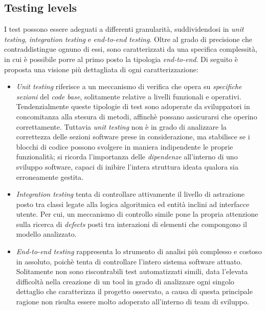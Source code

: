 \documentclass{article}
\begin{document}
\subsection*{Testing levels}
\large
I test possono essere adeguati a differenti granularità, suddividendosi in \textit{unit testing}, \textit{integration testing} e \textit{end-to-end testing}. Oltre al grado di precisione che contraddistingue ognuno di essi, sono caratterizzati da una specifica complessità, in cui è possibile porre al primo posto la tipologia \textit{end-to-end}. Di seguito è proposta una visione più dettagliata di ogni caratterizzazione:
\begin{itemize}[label={-}]
    \itemsep0em
    \item \textit{Unit testing} riferisce a un meccanismo di verifica che opera su \textit{specifiche sezioni} del \textit{code base}, solitamente relative a livelli funzionali e operativi. Tendenzialmente queste tipologie di test sono adoperate da sviluppatori in concomitanza alla stesura di metodi, affinchè possano assicurarsi che operino correttamente. Tuttavia \textit{unit testing} non è in grado di analizzare la correttezza delle sezioni software prese in considerazione, ma stabilisce se i blocchi di codice possono svolgere in maniera indipendente le proprie funzionalità; si ricorda l'importanza delle \textit{dipendenze} all'interno di uno sviluppo software, capaci di inibire l'intera struttura ideata qualora sia erroneamente gestita.
    \item \textit{Integration testing} tenta di controllare attivamente il livello di astrazione posto tra classi legate alla logica algoritmica ed entità inclini ad interfacce utente. Per cui, un meccanismo di controllo simile pone la propria attenzione sulla ricerca di \textit{defects} posti tra interazioni di elementi che compongono il modello analizzato.     
    \item \textit{End-to-end testing} rappresenta lo strumento di analisi più complesso e costoso in assoluto, poichè tenta di controllare l'intero sistema software attuato. Solitamente non sono riscontrabili test automatizzati simili, data l'elevata difficoltà nella creazione di un tool in grado di analizzare ogni singolo dettaglio che caratterizza il progetto osservato, a causa di questa principale ragione non risulta essere molto adoperato all'interno di team di sviluppo.
\end{itemize}
\end{document}
